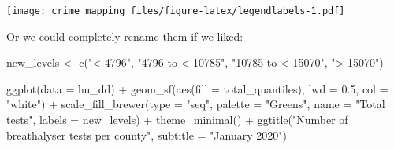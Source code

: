 \documentclass[
]{book}
\newenvironment{Shaded}{\begin{snugshade}}{\end{snugshade}}
\newcommand{\AttributeTok}[1]{\textcolor[rgb]{0.77,0.63,0.00}{#1}}
\newcommand{\FloatTok}[1]{\textcolor[rgb]{0.00,0.00,0.81}{#1}}
\newcommand{\FunctionTok}[1]{\textcolor[rgb]{0.00,0.00,0.00}{#1}}
\newcommand{\NormalTok}[1]{#1}
\newcommand{\OtherTok}[1]{\textcolor[rgb]{0.56,0.35,0.01}{#1}}
\newcommand{\SpecialCharTok}[1]{\textcolor[rgb]{0.00,0.00,0.00}{#1}}
\newcommand{\StringTok}[1]{\textcolor[rgb]{0.31,0.60,0.02}{#1}}
\begin{document}
\begin{Shaded}
\end{Shaded}

\texttt{[image: crime\_mapping\_files/figure-latex/legendlabels-1.pdf]}

Or we could completely rename them if we liked:

\begin{Shaded}
\begin{Highlighting}[]
\NormalTok{new\_levels }\OtherTok{\textless{}{-}} \FunctionTok{c}\NormalTok{(}\StringTok{"\textless{} 4796"}\NormalTok{, }\StringTok{"4796 to \textless{} 10785"}\NormalTok{, }\StringTok{"10785  to \textless{} 15070"}\NormalTok{, }\StringTok{"\textgreater{} 15070"}\NormalTok{)}

\FunctionTok{ggplot}\NormalTok{(}\AttributeTok{data =}\NormalTok{ hu\_dd) }\SpecialCharTok{+} 
  \FunctionTok{geom\_sf}\NormalTok{(}\FunctionTok{aes}\NormalTok{(}\AttributeTok{fill =}\NormalTok{ total\_quantiles), }\AttributeTok{lwd =} \FloatTok{0.5}\NormalTok{, }\AttributeTok{col =} \StringTok{"white"}\NormalTok{) }\SpecialCharTok{+} 
  \FunctionTok{scale\_fill\_brewer}\NormalTok{(}\AttributeTok{type =} \StringTok{"seq"}\NormalTok{, }\AttributeTok{palette =} \StringTok{"Greens"}\NormalTok{, }\AttributeTok{name =} \StringTok{"Total tests"}\NormalTok{, }\AttributeTok{labels =}\NormalTok{ new\_levels) }\SpecialCharTok{+} 
  \FunctionTok{theme\_minimal}\NormalTok{() }\SpecialCharTok{+} 
  \FunctionTok{ggtitle}\NormalTok{(}\StringTok{"Number of breathalyser tests per county"}\NormalTok{, }\AttributeTok{subtitle =} \StringTok{"January 2020"}\NormalTok{)}
\end{Highlighting}
\end{Shaded}
\end{document}
